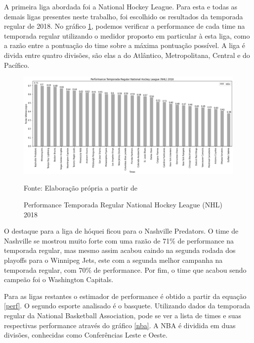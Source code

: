 \documentclass[12pt,oneside,a4paper,chapter=TITLE,english,brazil,sumario=abnt-6027-2012]{abntex2}
\begin{document}
	A primeira liga abordada foi a National Hockey League. Para esta e todas as demais ligas presentes neste trabalho, foi escolhido os resultados da temporada regular de 2018. No gráfico \ref{nhl}, podemos verificar a performance de cada time na temporada regular utilizando o medidor proposto em particular à esta liga, como a razão entre a pontuação do time sobre a máxima pontuação possível. A liga é divida entre quatro divisões, são elas a do Atlântico, Metropolitana, Central e do Pacífico.
	
	\begin{figure}[H]
		\centering
		\caption{Performance Temporada Regular National Hockey League (NHL) 2018}
		\includegraphics[scale=0.4]{../../output/figures/nhl.png}
		\label{nhl}
		\\ \vspace{0.25cm}
		\raggedright
		\footnotesize{Fonte: Elaboração própria a partir de }
	\end{figure}
	
	O destaque para a liga de hóquei ficou para o Nashville Predators. O time de Nashville se mostrou muito forte com uma razão de 71\% de performance na temporada regular, mas mesmo assim acabou caindo na segunda rodada dos playoffs para o Winnipeg Jets, este com a segunda melhor campanha na temporada regular, com 70\% de performance. Por fim, o time que acabou sendo campeão foi o Washington Capitals.
	
	Para as ligas restantes o estimador de performance é obtido a partir da equação \ref{perf}. O segundo esporte analisado é o basquete. Utilizando dados da temporada regular da National Basketball Association, pode se ver a lista de times e suas respectivas performance através do gráfico \ref{nba}. A NBA é dividida em duas divisões, conhecidas como Conferências Leste e Oeste.
	
\end{document}

